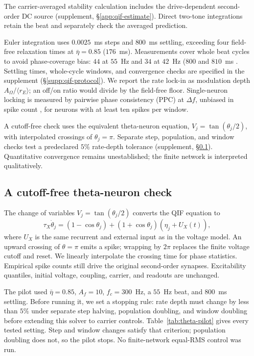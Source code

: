 \documentclass[11pt,a4paper]{article}
\newif\ifjne
\providecommand{\DIFaddtex}[1]{{\protect\color{blue} \sf #1}} %
\providecommand{\DIFdeltex}[1]{{\protect\color{red} \scriptsize #1}} %
\providecommand{\DIFaddbegin}{} %
\providecommand{\DIFaddend}{} %
\providecommand{\DIFdelbegin}{} %
\providecommand{\DIFdelend}{} %
\providecommand{\DIFadd}[1]{\texorpdfstring{\DIFaddtex{#1}}{#1}} %
\providecommand{\DIFdel}[1]{\texorpdfstring{\DIFdeltex{#1}}{}} %
\begin{document}
The carrier-averaged stability calculation includes the drive-dependent
second-order DC source (supplement, \S\ref{app:qif-estimate}). Direct two-tone
integrations retain the beat and separately check the averaged prediction.

Euler integration uses $0.0025$~ms steps\DIFdelbegin \DIFdel{and $800$~ms settling, exceeding
four field-free relaxation times at $\bar\eta=0.85$ ($176$~ms). Measurements cover whole beat cycles to avoid phase-coverage bias:
$44$ at $55$~Hz and $34$ at $42$~Hz ($800$ and $810$~ms}\DIFdelend \DIFaddbegin \DIFadd{. Settling times, whole-cycle windows,
and convergence checks are specified in the supplement
(\S\ref{supp:qif-protocol}}\DIFaddend ).
We report the rate lock-in as modulation depth
$A_\Omega/\langle r_E\rangle$; an off/on ratio would divide by the
field-free floor. Single-neuron locking is measured by pairwise phase
consistency (PPC) at $\Delta f$, unbiased in spike count
\cite{vinck2010}, for neurons with at least ten spikes per window.

A cutoff-free check uses the equivalent theta-neuron equation,
$V_j=\tan(\theta_j/2)$, with interpolated crossings of $\theta_j=\pi$.
Separate step, population, and window checks test a predeclared $5\%$
rate-depth tolerance (supplement, \S\ref{supp:theta-pilot}). Quantitative
convergence remains unestablished; the finite network is interpreted qualitatively.
\ifjne\else
\subsection{A cutoff-free theta-neuron check}\label{supp:theta-pilot}
The change of variables $V_j=\tan(\theta_j/2)$ converts the QIF equation to
\[
\tau_X\dot\theta_j=(1-\cos\theta_j)
 +(1+\cos\theta_j)(\eta_j+U_X(t)),
\]
where $U_X$ is the same recurrent and external input as in the voltage model.
An upward crossing of $\theta=\pi$ emits a spike; wrapping by $2\pi$ replaces
the finite voltage cutoff and reset. We linearly interpolate the crossing
time for phase statistics. Empirical spike counts still drive the original
second-order synapses. Excitability quantiles, initial voltage, coupling,
carrier, and readouts are unchanged.

The pilot used $\bar\eta=0.85$, $A_f=10$, $f_c=300$~Hz, a $55$~Hz beat,
and $800$~ms settling. Before running it, we set a stopping rule: rate depth
must change by less than $5\%$ under separate step halving, population
doubling, and window doubling before extending this solver to carrier controls.
Table~\ref{tab:theta-pilot} gives every tested setting. Step and window changes
satisfy that criterion; population doubling does not, so the pilot stops.
No finite-network equal-RMS control was run.
\end{document}
